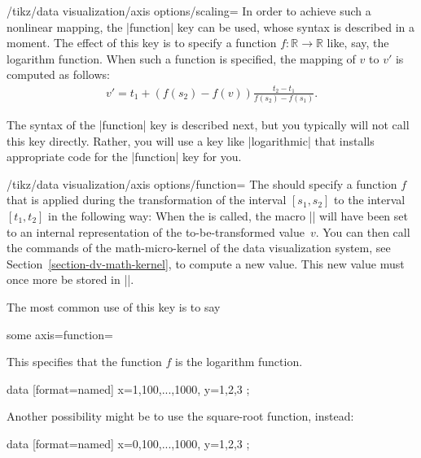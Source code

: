 \begin{key}{/tikz/data visualization/axis options/scaling=}
    In order to achieve such a nonlinear mapping, the |function| key can be
    used, whose syntax is described in a moment. The effect of this key is to
    specify a function $f \colon \mathbb{R} \to \mathbb{R}$ like, say, the
    logarithm function. When such a function is specified, the mapping of $v$
    to $v'$ is computed as follows:
    \begin{align*}
        v' = t_1 + (f(s_2) - f(v))\frac{t_2 - t_1}{f(s_2)-f(s_1)}.
    \end{align*}

    The syntax of the |function| key is described next, but you typically will
    not call this key directly. Rather, you will use a key like |logarithmic|
    that installs appropriate code for the |function| key for you.
    \begin{key}{/tikz/data visualization/axis options/function=}
        The  should specify a function $f$ that is applied during
        the transformation of the interval $[s_1,s_2]$ to the interval
        $[t_1,t_2]$ in the following way: When the  is called, the
        macro |\pgfvalue| will have been set to an internal representation of
        the to-be-transformed value~$v$. You can then call the commands of the
        math-micro-kernel of the data visualization system, see
        Section~\ref{section-dv-math-kernel}, to compute a new value. This new
        value must once more be stored in |\pgfvalue|.

        The most common use of this key is to say
\begin{codeexample}
some axis={function=\pgfdvmathln{\pgfvalue}{\pgfvalue}}
\end{codeexample}
        This specifies that the function $f$ is the logarithm function.
\begin{codeexample}[preamble={\usetikzlibrary{datavisualization}}]
\tikz \datavisualization
   [scientific axes,
    x axis={ticks={major={at={1,10,100,1000}}},
             scaling=1 at 0cm and 1000 at 3cm,
             function=\pgfdvmathln{\pgfvalue}{\pgfvalue}},
    visualize as scatter]
  data [format=named] {
    x={1,100,...,1000}, y={1,2,3}
  };
\end{codeexample}
        Another possibility might be to use the square-root function, instead:
\begin{codeexample}[preamble={\usetikzlibrary{datavisualization}}]
\tikz \datavisualization
   [scientific axes,
    x axis={ticks=few,
            scaling=1 at 0cm and 1000 at 3cm,
            function=\pgfdvmathunaryop{\pgfvalue}{sqrt}{\pgfvalue}},
    visualize as scatter]
  data [format=named] {
    x={0,100,...,1000}, y={1,2,3}
  };
\end{codeexample}
    \end{key}



\end{key}
